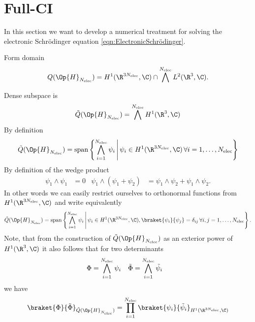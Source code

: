 \section{Full-CI}
\label{sec:FCI}


In this section we want to develop a numerical treatment
for solving the electronic Schrödinger equation \eqref{eqn:ElectronicSchrödinger}.

Form domain
\[ Q(\Op{H}_{\Nelec}) = H^1(\R^{3\Nelec}, \C) \cap \bigwedge^{\Nelec} L^2(\R^3, \C). \]

Dense subspace is
\[ \tilde{Q}(\Op{H}_{\Nelec}) =  \bigwedge^{\Nelec} H^1(\R^3, \C) \]
By definition
\[
	\tilde{Q}(\Op{H}_{\Nelec}) = \spacespan \left\{
		\bigwedge_{i=1}^{\Nelec} \psi_i
		\, \middle| \,
		\psi_i \in H^1(\R^{3\Nelec}, \C) \, \forall i = 1, \ldots, \Nelec
	\right\}
\]
By definition of the wedge product
\begin{align*}
	\psi_1 \wedge \psi_1 &= 0 & \psi_1 \wedge (\psi_1 + \psi_2) &= \psi_1 \wedge \psi_2 + \psi_1 \wedge \psi_2.
\end{align*}
In other words we can easily restrict ourselves to orthonormal
functions from $H^1(\R^{3\Nelec}, \C)$
and write equivalently
\[
	\tilde{Q}(\Op{H}_{\Nelec}) = \spacespan \left\{
		\bigwedge_{i=1}^{\Nelec} \psi_i
		\, \middle| \,
		\psi_i \in H^1(\R^{3\Nelec}, \C),
		\braket{\psi_i}{\psi_j} = \delta_{ij}
		\, \forall i,j = 1, \ldots, \Nelec
	\right\}.
\]
Note, that from the construction of $\tilde{Q}(\Op{H}_{\Nelec})$
as an exterior power of $H^1(\R^3, \C)$
it also follows that for two determinants
\begin{align*}
	\Phi &= \bigwedge_{i=1}^{N_\text{elec}} \psi_i &
	\tilde{\Phi} &= \bigwedge_{i=1}^{N_\text{elec}} \tilde{\psi}_i
\end{align*}
we have
\[
	\braket{\Phi}{\tilde{\Phi}}_{\tilde{Q}(\Op{H}_{\Nelec})}
	= \prod_{i=1}^{\Nelec} \braket{\psi_i}{\tilde{\psi}_i}_{H^1(\R^{3\Nelec}, \C)}
\]

